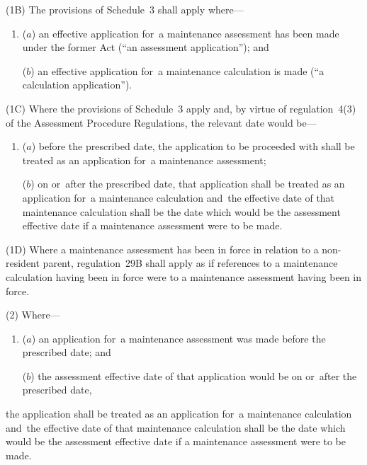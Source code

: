 \documentclass[12pt,a4paper]{article}
\begin{document}
(1B) The provisions of Schedule~3 shall apply where—
\begin{enumerate}\item[]
($a$) an effective application for~a maintenance assessment has been made under the former Act (“an assessment application”); and

($b$) an effective application for~a maintenance calculation is made 
(“a calculation application”).
\end{enumerate}

(1C) Where the provisions of Schedule~3 apply and, by virtue of regulation~4(3) of the Assessment Procedure Regulations, the relevant date would be—
\begin{enumerate}\item[]
($a$) before the prescribed date, the application to be proceeded with shall be treated as an application for~a maintenance assessment;

($b$) on or~after the prescribed date, that application shall be treated as an application for~a maintenance calculation and~the effective date of that maintenance calculation shall be the date which would be the assessment effective date if a maintenance assessment were to be made.
\end{enumerate}

(1D) Where a maintenance assessment has been in force in relation to a non-resident parent, regulation~29B shall apply as if references to a maintenance calculation having been in force were to a maintenance assessment having been in force.

(2) Where—
\begin{enumerate}\item[]
($a$) an application for~a maintenance assessment was made before the prescribed date; and

($b$) the assessment effective date of that application would be on or~after the prescribed date,
\end{enumerate}
the application shall be treated as an application for~a maintenance calculation and~the effective date of that maintenance calculation shall be the date which would be the assessment effective date if a maintenance assessment were to be made.
\end{document}
